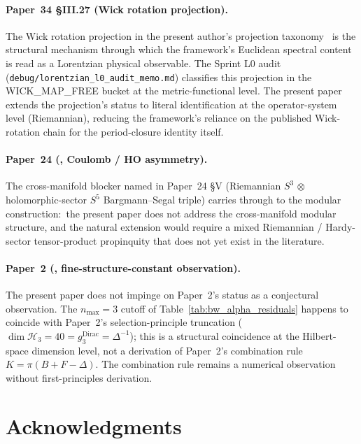 \documentclass[11pt,a4paper]{article}
\theoremstyle{plain}
\theoremstyle{definition}
\newcommand{\nmax}{n_{\max}}
\newcommand{\sthree}{S^{3}}
\newcommand{\Hilb}{\mathcal{H}}
\begin{document}
\paragraph{Paper~34 \S III.27 (Wick rotation projection).}
The Wick rotation projection in the present author's projection
taxonomy~\cite{paper34} is the structural mechanism through which the
framework's Euclidean spectral content is read as a Lorentzian
physical observable. The Sprint L0 audit
(\texttt{debug/lorentzian\_l0\_audit\_memo.md}) classifies this
projection in the WICK\_MAP\_FREE bucket at the metric-functional
level. The present paper extends the projection's status to literal
identification at the operator-system level (Riemannian), reducing
the framework's reliance on the published Wick-rotation chain for the
period-closure identity itself.

\paragraph{Paper~24 (\cite{paper24}, Coulomb / HO asymmetry).}
The cross-manifold blocker named in Paper~24 \S V (Riemannian $\sthree$
$\otimes$ holomorphic-sector $S^5$ Bargmann--Segal triple) carries
through to the modular construction:\ the present paper does not
address the cross-manifold modular structure, and the natural
extension would require a mixed Riemannian / Hardy-sector
tensor-product propinquity that does not yet exist in the literature.

\paragraph{Paper~2 (\cite{paper2}, fine-structure-constant
observation).}
The present paper does not impinge on Paper~2's status as a
conjectural observation. The $\nmax = 3$ cutoff of
Table~\ref{tab:bw_alpha_residuals} happens to coincide with Paper~2's
selection-principle truncation ($\dim \Hilb_3 = 40 = g_3^{\mathrm{Dirac}}
= \Delta^{-1}$); this is a structural coincidence at the Hilbert-space
dimension level, not a derivation of Paper~2's combination rule
$K = \pi(B + F - \Delta)$. The combination rule remains a numerical
observation without first-principles derivation.

\section*{Acknowledgments}
\end{document}
